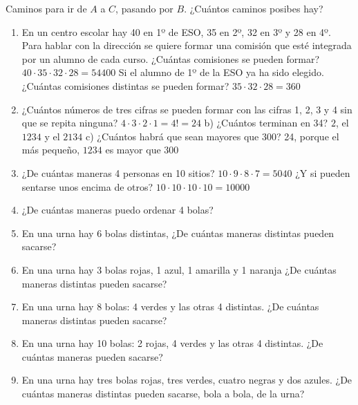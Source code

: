 Caminos para ir de $A$ a $C$, pasando por $B$. ¿Cuántos caminos posibes hay? 

\begin{enumerate}
	\item En un centro escolar hay 40 en 1º de ESO, 35 en 2º, 32 en 3º y 28 en 4º. Para hablar con la dirección se quiere formar una comisión que esté integrada por un alumno de cada curso. ¿Cuántas comisiones se pueden formar?
	{$40·35·32·28=54400$}
	\subitem Si el alumno de 1º de la ESO ya ha sido elegido. ¿Cuántas comisiones distintas se pueden formar?
	{$35·32·28=360$}
	\item ¿Cuántos números de tres cifras se pueden formar con las cifras 1, 2, 3 y 4 sin que se repita ninguna? 
	{$4·3·2·1 = 4! = 24$}
		\subitem b) ¿Cuántos terminan en 34? 
		{$2$, el $1234$ y el $2134$}
		\subitem c) ¿Cuántos habrá que sean mayores que 300?
		{24, porque el más pequeño, $1234$ es mayor que 300}
	\item ¿De cuántas maneras 4 personas en 10 sitios?
	{$10·9·8·7 = 5040$}
	\subitem ¿Y si pueden sentarse unos encima de otros? 
	{$10·10·10·10 = 10000$}
	\item ¿De cuántas maneras puedo ordenar 4 bolas?
	\item En una urna hay 6 bolas distintas, ¿De cuántas maneras distintas pueden sacarse? 
	\item En una urna hay 3 bolas rojas, 1 azul, 1 amarilla y 1 naranja ¿De cuántas maneras distintas pueden sacarse? 
	\item En una urna hay 8 bolas: 4 verdes y las otras 4 distintas. ¿De cuántas maneras distintas pueden sacarse?
	\item En una urna hay 10 bolas: 2 rojas, 4 verdes y las otras 4 distintas. ¿De cuántas maneras pueden sacarse?
	\item En una urna hay tres bolas rojas, tres verdes, cuatro negras y dos azules. ¿De cuántas maneras distintas pueden sacarse, bola a bola, de la urna?


\end{enumerate}
